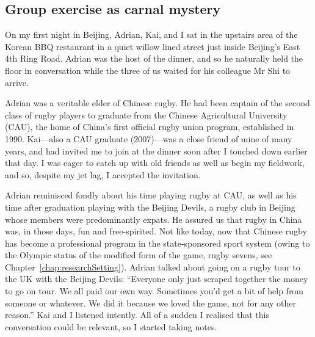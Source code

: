                                           \begin{CJK}{UTF8}{gbsn}

\section{Group exercise as carnal mystery\label{sect:adrian}}


On my first night in Beijing, Adrian, Kai, and I sat in the upstairs area of the Korean BBQ restaurant in a quiet willow lined street just inside Beijing's East 4th Ring Road.  Adrian was the host of the dinner, and so he naturally held the floor in conversation while the three of us waited for his colleague Mr Shi to arrive.

Adrian was a veritable elder of Chinese rugby.  He had been captain of the second class of rugby players to graduate from the Chinese Agricultural University (CAU), the home of China's first official rugby union program, established in 1990.  Kai---also a CAU graduate (2007)---was a close friend of mine of many years, and had invited me to join at the dinner soon after I touched down earlier that day.  I was eager to catch up with old friends as well as begin my fieldwork, and so, despite my jet lag, I accepted the invitation.

Adrian reminisced fondly about his time playing rugby at CAU, as well as his time after graduation playing with the Beijing Devils, a rugby club in Beijing whose members were predominantly expats.  He assured us that rugby in China was, in those days, fun and free-spirited.  Not like today, now that Chinese rugby has become a professional program in the state-sponsored sport system (owing to the Olympic status of the modified form of the game, rugby sevens, see Chapter~\ref{chap:researchSetting}).  Adrian talked about going on a rugby tour to the UK with the Beijing Devils:  ``Everyone only just scraped together the money to go on tour.  We all paid our own way. Sometimes you'd get a bit of help from someone or whatever. We did it because we loved the game, not for any other reason.''   Kai and I listened intently.  All of a sudden I realised that this conversation could be relevant, so I started taking notes.


\end{CJK}
